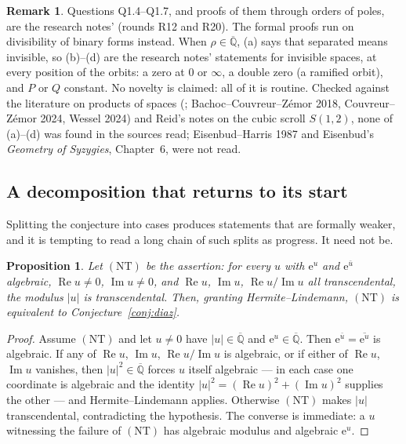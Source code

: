 \documentclass[11pt,a4paper]{article}
\theoremstyle{plain}
\newtheorem{proposition}[theorem]{Proposition}
\theoremstyle{definition}
\newtheorem{remark}[theorem]{Remark}
\newcommand{\e}{\mathrm{e}}
\newcommand{\Alg}{\overline{\mathbb{Q}}}
\begin{document}
\begin{remark}\label{rem:invisible-degree-two-credit}
Questions Q1.4--Q1.7, and proofs of them through orders of poles, are the research notes' (rounds R12 and R20).
The formal proofs run on divisibility of binary forms instead. When $\rho\in\Alg$, (a) says that separated means
invisible, so (b)--(d) are the research notes' statements for invisible spaces, at every position of the orbits:
a zero at $0$ or $\infty$, a double zero (a ramified orbit), and $P$ or $Q$ constant. No novelty is claimed: all of it
is routine. Checked against the literature on products of spaces (\cite{bachoc-serra-zemor}; Bachoc--Couvreur--Z\'emor 2018,
Couvreur--Z\'emor 2024, Wessel 2024) and Reid's notes on the cubic scroll $S(1,2)$, none of (a)--(d) was found in
the sources read; Eisenbud--Harris 1987 and Eisenbud's \emph{Geometry of Syzygies}, Chapter~6, were not read.
\end{remark}

\subsection*{A decomposition that returns to its start}

Splitting the conjecture into cases produces statements that are formally weaker, and it is
tempting to read a long chain of such splits as progress. It need not be.

\begin{proposition}\label{prop:loop}
Let $(\mathrm{NT})$ be the assertion: for every $u$ with $\e^{u}$ and $\e^{\bar u}$ algebraic,
$\operatorname{Re}u\neq0$, $\operatorname{Im}u\neq0$, and $\operatorname{Re}u$,
$\operatorname{Im}u$, $\operatorname{Re}u/\operatorname{Im}u$ all transcendental, the modulus
$\lvert u\rvert$ is transcendental. Then, granting Hermite--Lindemann, $(\mathrm{NT})$ is
equivalent to Conjecture~\ref{conj:diaz}.
\end{proposition}

\begin{proof}
Assume $(\mathrm{NT})$ and let $u\neq0$ have $\lvert u\rvert\in\Alg$ and $\e^{u}\in\Alg$. Then
$\e^{\bar u}=\overline{\e^{u}}$ is algebraic. If any of $\operatorname{Re}u$,
$\operatorname{Im}u$, $\operatorname{Re}u/\operatorname{Im}u$ is algebraic, or if either of
$\operatorname{Re}u$, $\operatorname{Im}u$ vanishes, then $\lvert u\rvert^{2}\in\Alg$ forces $u$
itself algebraic --- in each case one coordinate is algebraic and the identity
$\lvert u\rvert^{2}=(\operatorname{Re}u)^{2}+(\operatorname{Im}u)^{2}$ supplies the other ---
and Hermite--Lindemann applies. Otherwise $(\mathrm{NT})$ makes $\lvert u\rvert$ transcendental,
contradicting the hypothesis. The converse is immediate: a $u$ witnessing the failure of
$(\mathrm{NT})$ has algebraic modulus and algebraic $\e^{u}$.
\end{proof}
\end{document}
